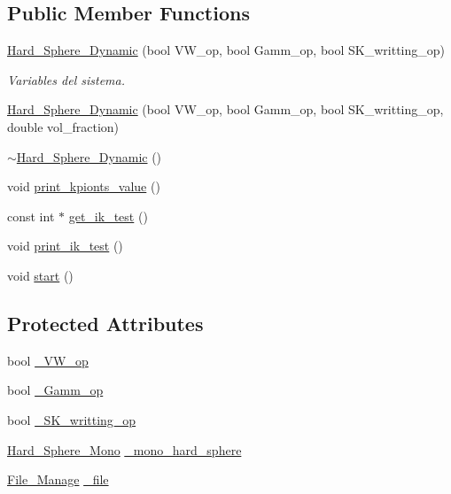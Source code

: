 \subsection*{Public Member Functions}
\begin{DoxyCompactItemize}
\item 
\hyperlink{class_hard___sphere___dynamic_a52c86bc67a1cc4bbaf5dd739ea3d38de}{Hard\+\_\+\+Sphere\+\_\+\+Dynamic} (bool V\+W\+\_\+op, bool Gamm\+\_\+op, bool S\+K\+\_\+writting\+\_\+op)
\begin{DoxyCompactList}\small\item\em Variables del sistema. \end{DoxyCompactList}\item 
\hyperlink{class_hard___sphere___dynamic_abcddb6f0527701fef31cc0d4a34d27b1}{Hard\+\_\+\+Sphere\+\_\+\+Dynamic} (bool V\+W\+\_\+op, bool Gamm\+\_\+op, bool S\+K\+\_\+writting\+\_\+op, double vol\+\_\+fraction)
\item 
\hyperlink{class_hard___sphere___dynamic_a86c15390c6497e1c626704a9653ca6d7}{$\sim$\+Hard\+\_\+\+Sphere\+\_\+\+Dynamic} ()
\item 
void \hyperlink{class_hard___sphere___dynamic_ad1f1cc8751a88075e519c7e3dce5dbb0}{print\+\_\+kpionts\+\_\+value} ()
\item 
const int $\ast$ \hyperlink{class_hard___sphere___dynamic_a70a006d373620de171d20c372f120264}{get\+\_\+ik\+\_\+test} ()
\item 
void \hyperlink{class_hard___sphere___dynamic_ac0e14ebb320daa58e6551e5e59a8e661}{print\+\_\+ik\+\_\+test} ()
\item 
void \hyperlink{class_hard___sphere___dynamic_a1e2546e5ffc8d960fca450492459bbef}{start} ()
\end{DoxyCompactItemize}
\subsection*{Protected Attributes}
\begin{DoxyCompactItemize}
\item 
bool \hyperlink{class_hard___sphere___dynamic_a057b063e3d733b1fb4b90cfe09f13238}{\+\_\+\+V\+W\+\_\+op}
\item 
bool \hyperlink{class_hard___sphere___dynamic_a3f8dd6e127d79f663112061a5f90143e}{\+\_\+\+Gamm\+\_\+op}
\item 
bool \hyperlink{class_hard___sphere___dynamic_ae761d6f2670d1f849e13f0d1d50d1db5}{\+\_\+\+S\+K\+\_\+writting\+\_\+op}
\item 
\hyperlink{class_hard___sphere___mono}{Hard\+\_\+\+Sphere\+\_\+\+Mono} \hyperlink{class_hard___sphere___dynamic_a35022dac6e1ca069c2125cc2724827ae}{\+\_\+mono\+\_\+hard\+\_\+sphere}
\item 
\hyperlink{class_file___manage}{File\+\_\+\+Manage} \hyperlink{class_hard___sphere___dynamic_a5f7e5e8fbe16c2bffa314d4d43d4adc9}{\+\_\+file}
\end{DoxyCompactItemize}


